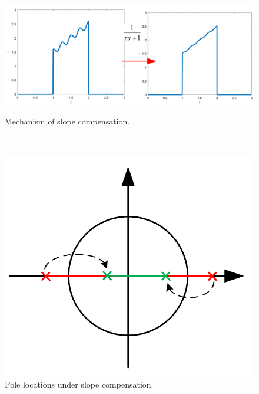 \begin{figure}
\begin{minipage}{0.32\textwidth}
    \centering
    \includegraphics[width=\textwidth]{Figure/section3/filter/filter.png}
    \caption{ \label{fig:filter1} Mechanism of slope compensation.}
\end{minipage}
~
\begin{minipage}{0.32\textwidth}
    \centering
    \includegraphics[width=\textwidth]{Figure/section3/filter/filterpole.PNG}
  \caption{  \label{fig:filter2} Pole locations under slope compensation.}
\end{minipage}
\end{figure}

